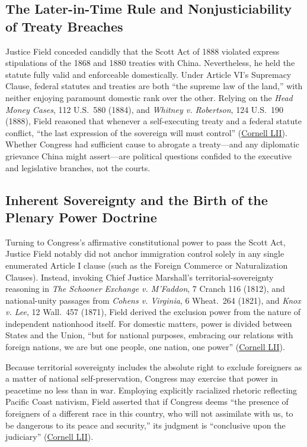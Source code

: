 \documentclass[12pt]{article}
\begin{document}
\subsection{The Later-in-Time Rule and Nonjusticiability of Treaty Breaches}
Justice Field conceded candidly that the Scott Act of 1888 violated express stipulations of the 1868 and 1880 treaties with China. Nevertheless, he held the statute fully valid and enforceable domestically. Under Article VI's Supremacy Clause, federal statutes and treaties are both ``the supreme law of the land,'' with neither enjoying paramount domestic rank over the other. Relying on the \textit{Head Money Cases}, 112 U.S.\ 580 (1884), and \textit{Whitney v. Robertson}, 124 U.S.\ 190 (1888), Field reasoned that whenever a self-executing treaty and a federal statute conflict, ``the last expression of the sovereign will must control'' (\href{https://www.law.cornell.edu/supremecourt/text/130/581}{Cornell LII}). Whether Congress had sufficient cause to abrogate a treaty---and any diplomatic grievance China might assert---are political questions confided to the executive and legislative branches, not the courts.

\subsection{Inherent Sovereignty and the Birth of the Plenary Power Doctrine}
Turning to Congress's affirmative constitutional power to pass the Scott Act, Justice Field notably did not anchor immigration control solely in any single enumerated Article I clause (such as the Foreign Commerce or Naturalization Clauses). Instead, invoking Chief Justice Marshall's territorial-sovereignty reasoning in \textit{The Schooner Exchange v. M'Faddon}, 7 Cranch 116 (1812), and national-unity passages from \textit{Cohens v. Virginia}, 6 Wheat.\ 264 (1821), and \textit{Knox v. Lee}, 12 Wall.\ 457 (1871), Field derived the exclusion power from the nature of independent nationhood itself. For domestic matters, power is divided between States and the Union, ``but for national purposes, embracing our relations with foreign nations, we are but one people, one nation, one power'' (\href{https://www.law.cornell.edu/supremecourt/text/130/581}{Cornell LII}).

Because territorial sovereignty includes the absolute right to exclude foreigners as a matter of national self-preservation, Congress may exercise that power in peacetime no less than in war. Employing explicitly racialized rhetoric reflecting Pacific Coast nativism, Field asserted that if Congress deems ``the presence of foreigners of a different race in this country, who will not assimilate with us, to be dangerous to its peace and security,'' its judgment is ``conclusive upon the judiciary'' (\href{https://www.law.cornell.edu/supremecourt/text/130/581}{Cornell LII}).
\end{document}
